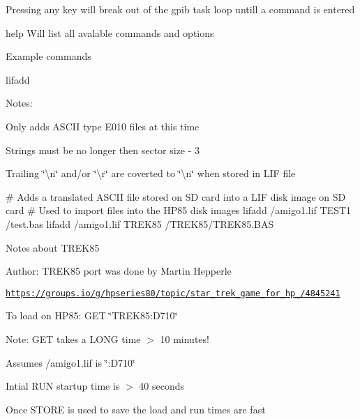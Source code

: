 \begin{DoxyItemize}
\item Pressing any key will break out of the gpib task loop untill a command is entered
\begin{DoxyItemize}
\item help Will list all avalable commands and options
\item Example commands
\begin{DoxyItemize}
\item lifadd
\begin{DoxyItemize}
\item Notes\+:
\begin{DoxyItemize}
\item Only adds A\+S\+C\+II type E010 files at this time
\item Strings must be no longer then sector size -\/ 3
\item Trailing \char`\"{}\textbackslash{}n\char`\"{} and/or \char`\"{}\textbackslash{}r\char`\"{} are coverted to \char`\"{}\textbackslash{}n\char`\"{} when stored in L\+IF file 
\begin{DoxyPre}
         \# Adds a translated ASCII file stored on SD card into a LIF disk image on SD card
         \# Used to import files into the HP85 disk images
         lifadd /amigo1.lif TEST1 /test.bas
         lifadd /amigo1.lif TREK85 /TREK85/TREK85.BAS
      \end{DoxyPre}

\end{DoxyItemize}
\end{DoxyItemize}
\end{DoxyItemize}
\end{DoxyItemize}
\end{DoxyItemize}

Notes about T\+R\+E\+K85
\begin{DoxyItemize}
\item Author\+: T\+R\+E\+K85 port was done by Martin Hepperle
\item \href{https://groups.io/g/hpseries80/topic/star_trek_game_for_hp_85/4845241}{\tt https\+://groups.\+io/g/hpseries80/topic/star\+\_\+trek\+\_\+game\+\_\+for\+\_\+hp\+\_/4845241}
\begin{DoxyItemize}
\item To load on H\+P85\+: G\+ET \char`\"{}\+T\+R\+E\+K85\+:\+D710\char`\"{}
\begin{DoxyItemize}
\item Note\+: G\+ET takes a L\+O\+NG time $>$ 10 minutes!
\end{DoxyItemize}
\item Assumes /amigo1.lif is \char`\"{}\+:\+D710\char`\"{}
\begin{DoxyItemize}
\item Intial R\+UN startup time is $>$ 40 seconds
\end{DoxyItemize}
\item Once S\+T\+O\+RE is used to save the load and run times are fast
\end{DoxyItemize}
\end{DoxyItemize}

